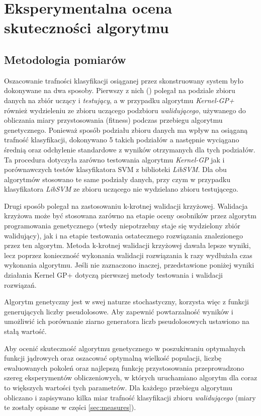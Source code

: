 
\chapter{Eksperymentalna ocena skuteczności algorytmu}

\section{Metodologia pomiarów}
	Oszacowanie trafności klasyfikacji osiąganej przez skonstruowany system było dokonywane na dwa sposoby. Pierwszy z nich () polegał na podziale zbioru danych na zbiór uczący i \emph{testujący}, a w przypadku algorytmu \emph{Kernel-GP+} również wydzieleniu ze zbioru uczącego podzbioru \emph{walidującego}, używanego do obliczania miary przystosowania (fitness) podczas przebiegu algorytmu genetycznego. Ponieważ sposób podziału zbioru danych ma wpływ na osiąganą trafność klasyfikacji, dokonywano 5 takich podziałów a następnie wyciągano średnią oraz odchylenie standardowe z wyników otrzymanych dla tych podziałów. Ta procedura dotyczyła zarówno testowania algorytmu \emph{Kernel-GP} jak i porównawczych testów klasyfikatora SVM z biblioteki \emph{LibSVM}. Dla obu algorytmów stosowano te same podziały danych, przy czym w przypadku klasyfikatora \emph{LibSVM} ze zbioru uczącego nie wydzielano zbioru testującego.

	Drugi sposób polegał na zastosowaniu k-krotnej walidacji krzyżowej. Walidacja krzyżowa może być stosowana zarówno na etapie oceny osobników przez algorytm programowania genetycznego (wtedy niepotrzebny staje się wydzielony zbiór walidujący), jak i na etapie testowania ostatecznego rozwiązania znalezionego przez ten algorytm. Metoda k-krotnej walidacji krzyżowej dawała lepsze wyniki, lecz poprzez konieczność wykonania walidacji rozwiązania k razy wydłużała czas wykonania algorytmu. Jeśli nie zaznaczono inaczej, przedstawione poniżej wyniki działania Kernel GP+ dotyczą pierwszej metody testowania i walidacji rozwiązań.
	
	Algorytm genetyczny jest w swej naturze stochastyczny, korzysta więc z funkcji generujących liczby pseudolosowe. Aby zapewnić powtarzalność wyników i umożliwić ich porównanie ziarno generatora liczb pseudolosowych ustawiono na stałą wartość.

	Aby ocenić skuteczność algorytmu genetycznego w poszukiwaniu optymalnych funkcji jądrowych oraz oszacować optymalną wielkość populacji, liczbę ewaluowanych pokoleń oraz najlepszą funkcję przystosowania przeprowadzono szereg eksperymentów obliczeniowych, w których uruchamiano algorytm dla coraz to większych wartości tych parametrów. Dla każdego przebiegu algorytmu obliczano i zapisywano kilka miar trafność klasyfikacji zbioru \emph{walidującego} (miary te zostały opisane w części \ref{sec:measures}).

